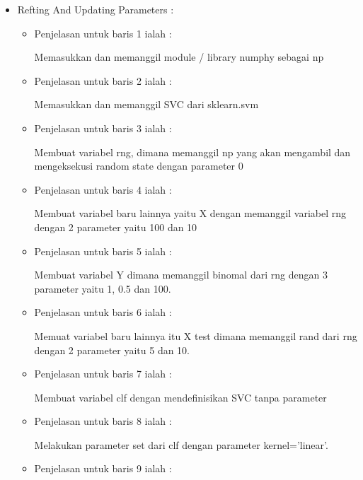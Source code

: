 \begin{itemize}
\begin{itemize}
\par
\par
\par
\par
\par
\begin{itemize}
\item Refting And Updating Parameters :
\par
\begin{itemize}
\item Penjelasan untuk baris 1 ialah : 
\par Memasukkan dan memanggil module / library numphy sebagai np
\par
\par
\item Penjelasan untuk baris 2 ialah :
\par Memasukkan dan memanggil SVC dari sklearn.svm
\par
\item Penjelasan untuk baris 3  ialah :
\par Membuat variabel rng, dimana memanggil np yang akan mengambil dan mengeksekusi random state dengan parameter 0
\par
\item Penjelasan untuk baris 4  ialah :
\par Membuat variabel baru lainnya yaitu X dengan memanggil variabel rng dengan 2 parameter yaitu 100 dan 10
\par
\item Penjelasan untuk baris 5  ialah :
\par Membuat variabel Y dimana memanggil binomal dari rng dengan 3 parameter yaitu 1, 0.5 dan 100.
\par
\item Penjelasan untuk baris 6 ialah :
\par Memuat variabel baru lainnya itu X test dimana memanggil rand dari rng dengan 2 parameter yaitu 5 dan 10.
\par
\item Penjelasan untuk baris 7 ialah : 
\par Membuat variabel clf dengan mendefinisikan SVC tanpa parameter
\par
\par
\item Penjelasan untuk baris 8 ialah :
\par Melakukan parameter set dari clf dengan parameter kernel='linear'.
\par
\item Penjelasan untuk baris 9 ialah :

\end{itemize}
\end{itemize}
\end{itemize}
\end{itemize}

